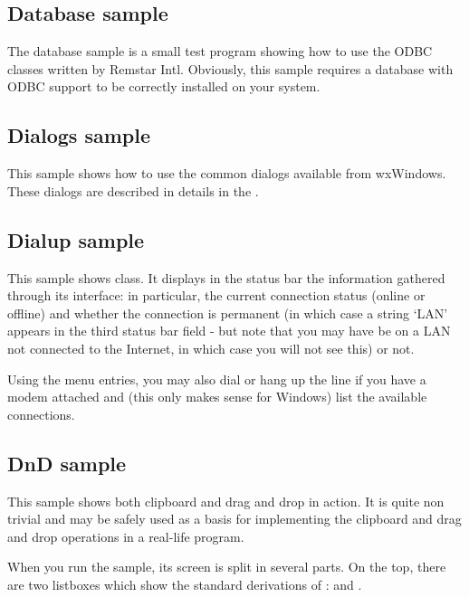 \subsection{Database sample}\label{sampledb}

The database sample is a small test program showing how to use the ODBC
classes written by Remstar Intl.  Obviously, this sample requires a 
database with ODBC support to be correctly installed on your system.

\subsection{Dialogs sample}\label{sampledialogs}

This sample shows how to use the common dialogs available from wxWindows. These
dialogs are described in details in the .

\subsection{Dialup sample}\label{sampledialup}

This sample shows  
class. It displays in the status bar the information gathered through its
interface: in particular, the current connection status (online or offline) and
whether the connection is permanent (in which case a string `LAN' appears in
the third status bar field - but note that you may have be on a LAN not
connected to the Internet, in which case you will not see this) or not.

Using the menu entries, you may also dial or hang up the line if you have a
modem attached and (this only makes sense for Windows) list the available
connections.

\subsection{DnD sample}\label{samplednd}

This sample shows both clipboard and drag and drop in action. It is quite non
trivial and may be safely used as a basis for implementing the clipboard and
drag and drop operations in a real-life program.

When you run the sample, its screen is split in several parts. On the top,
there are two listboxes which show the standard derivations of 
: 
 and 
.

